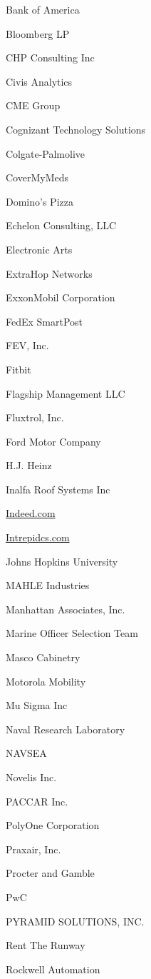 \documentclass[twoside]{article}
\begin{document}
\begin{center}
\begin{multicols}{5}
\begin{FlushLeft}
\begin{compactitem}
\item Bank of America
\item Bloomberg LP
\item CHP Consulting Inc
\item Civis Analytics
\item CME Group
\item Cognizant Technology Solutions
\item Colgate-Palmolive
\item CoverMyMeds
\item Domino's Pizza
\item Echelon Consulting, LLC
\item Electronic Arts
\item ExtraHop Networks
\item ExxonMobil Corporation
\item FedEx SmartPost
\item FEV, Inc.
\item Fitbit
\item Flagship Management LLC
\item Fluxtrol, Inc.
\item Ford Motor Company
\item H.J. Heinz
\item Inalfa Roof Systems Inc
\item \url{Indeed.com}
\item \url{Intrepidcs.com}
\item Johns Hopkins University
\item MAHLE Industries
\item Manhattan Associates, Inc.
\item Marine Officer Selection Team
\item Masco Cabinetry
\item Motorola Mobility
\item Mu Sigma Inc
\item Naval Research Laboratory
\item NAVSEA
\item Novelis Inc.
\item PACCAR Inc.
\item PolyOne Corporation
\item Praxair, Inc.
\item Procter and Gamble
\item PwC
\item PYRAMID SOLUTIONS, INC.
\item Rent The Runway
\item Rockwell Automation

\end{compactitem}
\end{FlushLeft}
\end{multicols}
\end{center}
\end{document}
